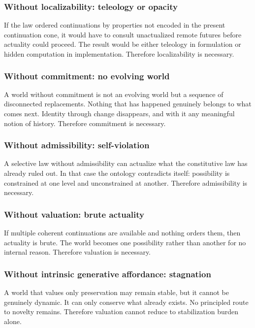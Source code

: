 \documentclass[11pt]{article}
\theoremstyle{foundation}
\begin{document}
\subsubsection{Without localizability: teleology or opacity}

If the law ordered continuations by properties not encoded in the present continuation cone, it would have to consult unactualized remote futures before actuality could proceed. The result would be either teleology in formulation or hidden computation in implementation. Therefore localizability is necessary.

\subsubsection{Without commitment: no evolving world}

A world without commitment is not an evolving world but a sequence of disconnected replacements. Nothing that has happened genuinely belongs to what comes next. Identity through change disappears, and with it any meaningful notion of history. Therefore commitment is necessary.

\subsubsection{Without admissibility: self-violation}

A selective law without admissibility can actualize what the constitutive law has already ruled out. In that case the ontology contradicts itself: possibility is constrained at one level and unconstrained at another. Therefore admissibility is necessary.

\subsubsection{Without valuation: brute actuality}

If multiple coherent continuations are available and nothing orders them, then actuality is brute. The world becomes one possibility rather than another for no internal reason. Therefore valuation is necessary.

\subsubsection{Without intrinsic generative affordance: stagnation}

A world that values only preservation may remain stable, but it cannot be genuinely dynamic. It can only conserve what already exists. No principled route to novelty remains. Therefore valuation cannot reduce to stabilization burden alone.
\end{document}
